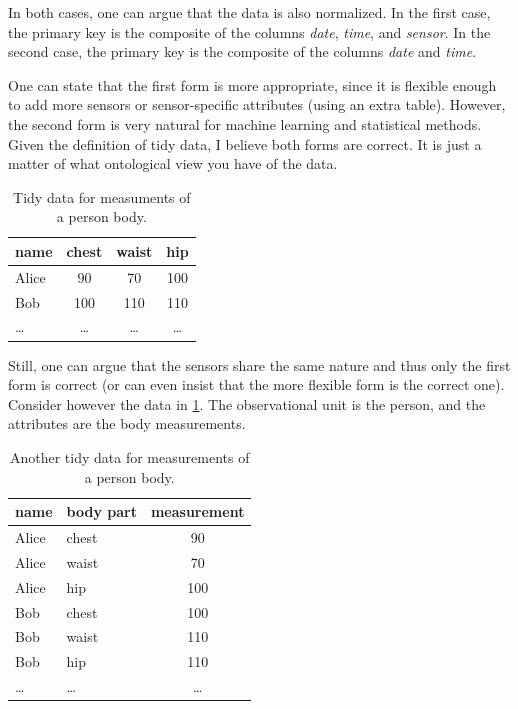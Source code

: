 In both cases, one can argue that the data is also normalized.  In the first case, the
primary key is the composite of the columns \emph{date}, \emph{time}, and \emph{sensor}.
In the second case, the primary key is the composite of the columns \emph{date} and
\emph{time}.

One can state that the first form is more appropriate, since it is flexible enough to add more
sensors or sensor-specific attributes (using an extra table).  However, the second form is very natural for machine learning and statistical
methods.  Given the definition of tidy data, I believe both forms are correct.  It is
just a matter of what ontological view you have of the data.

\begin{table}
  \centering
  \begin{tabular}{lccc}
    \toprule
    \textbf{name} & \textbf{chest} & \textbf{waist} & \textbf{hip} \\
    \midrule
    Alice & 90 & 70 & 100 \\
    Bob & 100 & 110 & 110 \\
    \dots & \dots & \dots & \dots \\
    \bottomrule
  \end{tabular}
  \caption{Tidy data for measuments of a person body.}
  \label{tab:body1}
\end{table}

Still, one can argue that the sensors share the same nature and thus only the first
form is correct (or can even insist that the more flexible form is the correct one).
Consider however the data in \cref{tab:body1}.  The observational unit is the person, and
the attributes are the body measurements.

\begin{table}
  \centering
  \begin{tabular}{llc}
    \toprule
    \textbf{name} & \textbf{body part} & \textbf{measurement} \\
    \midrule
    Alice & chest & 90 \\
    Alice & waist & 70 \\
    Alice & hip & 100 \\
    Bob & chest & 100 \\
    Bob & waist & 110 \\
    Bob & hip & 110 \\
    \dots & \dots & \dots \\
    \bottomrule
  \end{tabular}
  \caption{Another tidy data for measurements of a person body.}
  \label{tab:body2}
\end{table}

